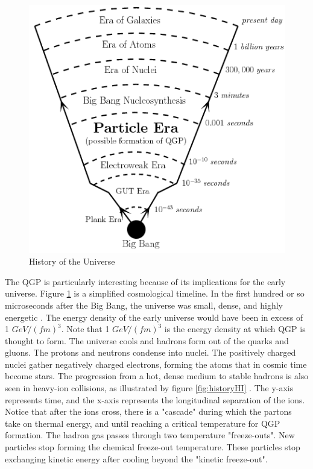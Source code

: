\begin{figure}[h!]
\begin{centering}
\includegraphics[width=5in]{Chapter1/importfigs/fig_bb_timeline.png}
\par\end{centering}
\caption{History of the Universe \cite{Bandyopadhyay:2017wip} \label{fig:history}}
\end{figure}

The QGP is particularly interesting because of its implications for the early universe. Figure \ref{fig:history} is a simplified cosmological timeline. In the first hundred or so microseconds after the Big Bang, the universe was small, dense, and highly energetic \cite{Bandyopadhyay:2017wip}. The energy density of the early universe would have been in excess of 1 $GeV/(fm)^3$. Note that 1 $GeV/(fm)^3$ is the energy density at which QGP is thought to form. The universe cools and hadrons form out of the quarks and gluons. The protons and neutrons condense into nuclei. The positively charged nuclei gather negatively charged electrons, forming the atoms that in cosmic time become stars. The progression from a hot, dense medium to stable hadrons is also seen in heavy-ion collisions, as illustrated by figure \ref{fig:historyHI} \cite{Wang:2012jua}. The y-axis represents time, and the x-axis represents the longitudinal separation of the ions. Notice that after the ions cross, there is a "cascade" during which the partons take on thermal energy, and until reaching a critical temperature for QGP formation. The hadron gas passes through two temperature "freeze-outs". New particles stop forming the chemical freeze-out temperature. These particles stop exchanging kinetic energy after cooling beyond the "kinetic freeze-out".


